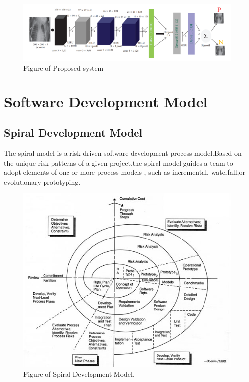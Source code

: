 \documentclass[12pt, a4paper]{report}
\begin{document}
\vfill
\begin{figure}
\includegraphics[width=350 pt ,height=150 pt]{pic.png}
\caption{Figure of Proposed system \label{fig:3.1}}
\end{figure}
\section{Software Development Model}
\subsection{Spiral Development Model}
The spiral model is a risk-driven software development process model.Based on the
unique risk patterns of a given project,the spiral model guides a team to adopt elements
of one or more process models , such as incremental, waterfall,or evolutionary prototyping.

\begin{figure}
\includegraphics[scale = 3]{spiral.jpg}
\caption{Figure of Spiral Development Model.\label{fig:3.2}}
\end{figure}
\vfill
\pagebreak
\end{document}
